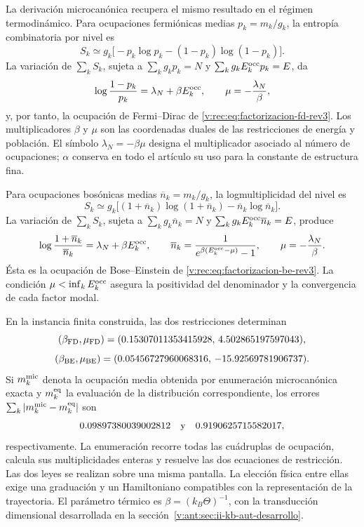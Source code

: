 La derivación microcanónica recupera el mismo resultado en el régimen
termodinámico. Para ocupaciones fermiónicas medias
\(p_k=m_k/g_k\), la entropía combinatoria por nivel es
\begin{equation}
 S_k\simeq
 g_k\bigl[-p_k\log p_k-(1-p_k)\log(1-p_k)\bigr].
 \label{v:rec:eq:entropia-fd-nivel-rev3}
\end{equation}
La variación de \(\sum_kS_k\), sujeta a
\(\sum_kg_kp_k=N\) y
\(\sum_kg_kE_k^{\rm occ}p_k=E\), da
\begin{equation}
 \log\frac{1-p_k}{p_k}=\lambda_N+\beta E_k^{\rm occ},
 \qquad
 \mu=-\frac{\lambda_N}{\beta},
 \label{v:rec:eq:variacion-fd-rev3}
\end{equation}
y, por tanto, la ocupación de Fermi--Dirac de
\eqref{v:rec:eq:factorizacion-fd-rev3}. Los multiplicadores \(\beta\) y \(\mu\)
son las coordenadas duales de las restricciones de energía y población.
El símbolo \(\lambda_N=-\beta\mu\) designa el multiplicador asociado al
número de ocupaciones; \(\alpha\) conserva en todo el artículo su uso
para la constante de estructura fina.

Para ocupaciones bosónicas medias
\(\overline n_k=m_k/g_k\), la logmultiplicidad del nivel es
\begin{equation}
 S_k\simeq
 g_k\bigl[(1+\overline n_k)\log(1+\overline n_k)
          -\overline n_k\log\overline n_k\bigr].
 \label{v:rec:eq:entropia-be-nivel-rev3}
\end{equation}
La variación de \(\sum_kS_k\), sujeta a
\(\sum_kg_k\overline n_k=N\) y
\(\sum_kg_kE_k^{\rm occ}\overline n_k=E\), produce
\begin{equation}
 \log\frac{1+\overline n_k}{\overline n_k}
 =\lambda_N+\beta E_k^{\rm occ},
 \qquad
 \overline n_k
 =\frac{1}{e^{\beta(E_k^{\rm occ}-\mu)}-1},
 \qquad
 \mu=-\frac{\lambda_N}{\beta}.
 \label{v:rec:eq:variacion-be-rev3}
\end{equation}
Ésta es la ocupación de Bose--Einstein de
\eqref{v:rec:eq:factorizacion-be-rev3}. La condición
\(\mu<\inf_kE_k^{\rm occ}\) asegura la positividad del denominador y la
convergencia de cada factor modal.

En la instancia finita construida, las dos restricciones determinan
\[
 (\beta_{\rm FD},\mu_{\rm FD})
 =(0.15307011353415928,\,4.502865197597043),
\]
\[
 (\beta_{\rm BE},\mu_{\rm BE})
 =(0.05456727960068316,\,-15.92569781906737).
\]
Si \(m_k^{\rm mic}\) denota la ocupación media obtenida por enumeración
microcanónica exacta y \(m_k^{\rm eq}\) la evaluación de la distribución
correspondiente, los errores
\(\sum_k|m_k^{\rm mic}-m_k^{\rm eq}|\) son
\[
 0.09897380039002812\quad\hbox{y}\quad
 0.9190625715582017,
\]
respectivamente. La enumeración recorre todas las cuádruplas de ocupación,
calcula sus multiplicidades enteras y resuelve las dos ecuaciones de
restricción. Las dos leyes se realizan sobre una misma pantalla. La elección
física entre ellas exige una graduación y un Hamiltoniano compatibles con la
representación de la trayectoria. El parámetro térmico es
\(\beta=(k_B\Theta)^{-1}\), con la transducción dimensional desarrollada en
la sección~\ref{v:ant:sec:ii-kb-aut-desarrollo}.

